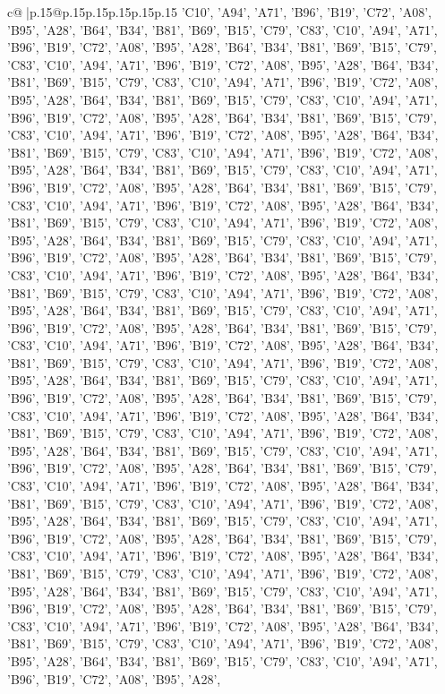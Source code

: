 \documentclass{article}
\begin{document}
{\begin{supertabular}{c@{$\;$}|p{.15\linewidth}@{}p{.15\linewidth}p{.15\linewidth}p{.15\linewidth}p{.15\linewidth}p{.15\linewidth}}
{{{{'C10', 'A94', 'A71', 'B96', 'B19', 'C72', 'A08', 'B95', 'A28', 'B64', 'B34', 'B81', 'B69', 'B15', 'C79', 'C83', 'C10', 'A94', 'A71', 'B96', 'B19', 'C72', 'A08', 'B95', 'A28', 'B64', 'B34', 'B81', 'B69', 'B15', 'C79', 'C83', 'C10', 'A94', 'A71', 'B96', 'B19', 'C72', 'A08', 'B95', 'A28', 'B64', 'B34', 'B81', 'B69', 'B15', 'C79', 'C83', 'C10', 'A94', 'A71', 'B96', 'B19', 'C72', 'A08', 'B95', 'A28', 'B64', 'B34', 'B81', 'B69', 'B15', 'C79', 'C83', 'C10', 'A94', 'A71', 'B96', 'B19', 'C72', 'A08', 'B95', 'A28', 'B64', 'B34', 'B81', 'B69', 'B15', 'C79', 'C83', 'C10', 'A94', 'A71', 'B96', 'B19', 'C72', 'A08', 'B95', 'A28', 'B64', 'B34', 'B81', 'B69', 'B15', 'C79', 'C83', 'C10', 'A94', 'A71', 'B96', 'B19', 'C72', 'A08', 'B95', 'A28', 'B64', 'B34', 'B81', 'B69', 'B15', 'C79', 'C83', 'C10', 'A94', 'A71', 'B96', 'B19', 'C72', 'A08', 'B95', 'A28', 'B64', 'B34', 'B81', 'B69', 'B15', 'C79', 'C83', 'C10', 'A94', 'A71', 'B96', 'B19', 'C72', 'A08', 'B95', 'A28', 'B64', 'B34', 'B81', 'B69', 'B15', 'C79', 'C83', 'C10', 'A94', 'A71', 'B96', 'B19', 'C72', 'A08', 'B95', 'A28', 'B64', 'B34', 'B81', 'B69', 'B15', 'C79', 'C83', 'C10', 'A94', 'A71', 'B96', 'B19', 'C72', 'A08', 'B95', 'A28', 'B64', 'B34', 'B81', 'B69', 'B15', 'C79', 'C83', 'C10', 'A94', 'A71', 'B96', 'B19', 'C72', 'A08', 'B95', 'A28', 'B64', 'B34', 'B81', 'B69', 'B15', 'C79', 'C83', 'C10', 'A94', 'A71', 'B96', 'B19', 'C72', 'A08', 'B95', 'A28', 'B64', 'B34', 'B81', 'B69', 'B15', 'C79', 'C83', 'C10', 'A94', 'A71', 'B96', 'B19', 'C72', 'A08', 'B95', 'A28', 'B64', 'B34', 'B81', 'B69', 'B15', 'C79', 'C83', 'C10', 'A94', 'A71', 'B96', 'B19', 'C72', 'A08', 'B95', 'A28', 'B64', 'B34', 'B81', 'B69', 'B15', 'C79', 'C83', 'C10', 'A94', 'A71', 'B96', 'B19', 'C72', 'A08', 'B95', 'A28', 'B64', 'B34', 'B81', 'B69', 'B15', 'C79', 'C83', 'C10', 'A94', 'A71', 'B96', 'B19', 'C72', 'A08', 'B95', 'A28', 'B64', 'B34', 'B81', 'B69', 'B15', 'C79', 'C83', 'C10', 'A94', 'A71', 'B96', 'B19', 'C72', 'A08', 'B95', 'A28', 'B64', 'B34', 'B81', 'B69', 'B15', 'C79', 'C83', 'C10', 'A94', 'A71', 'B96', 'B19', 'C72', 'A08', 'B95', 'A28', 'B64', 'B34', 'B81', 'B69', 'B15', 'C79', 'C83', 'C10', 'A94', 'A71', 'B96', 'B19', 'C72', 'A08', 'B95', 'A28', 'B64', 'B34', 'B81', 'B69', 'B15', 'C79', 'C83', 'C10', 'A94', 'A71', 'B96', 'B19', 'C72', 'A08', 'B95', 'A28', 'B64', 'B34', 'B81', 'B69', 'B15', 'C79', 'C83', 'C10', 'A94', 'A71', 'B96', 'B19', 'C72', 'A08', 'B95', 'A28', 'B64', 'B34', 'B81', 'B69', 'B15', 'C79', 'C83', 'C10', 'A94', 'A71', 'B96', 'B19', 'C72', 'A08', 'B95', 'A28', 'B64', 'B34', 'B81', 'B69', 'B15', 'C79', 'C83', 'C10', 'A94', 'A71', 'B96', 'B19', 'C72', 'A08', 'B95', 'A28', 'B64', 'B34', 'B81', 'B69', 'B15', 'C79', 'C83', 'C10', 'A94', 'A71', 'B96', 'B19', 'C72', 'A08', 'B95', 'A28', 'B64', 'B34', 'B81', 'B69', 'B15', 'C79', 'C83', 'C10', 'A94', 'A71', 'B96', 'B19', 'C72', 'A08', 'B95', 'A28', 'B64', 'B34', 'B81', 'B69', 'B15', 'C79', 'C83', 'C10', 'A94', 'A71', 'B96', 'B19', 'C72', 'A08', 'B95', 'A28', 'B64', 'B34', 'B81', 'B69', 'B15', 'C79', 'C83', 'C10', 'A94', 'A71', 'B96', 'B19', 'C72', 'A08', 'B95', 'A28', 'B64', 'B34', 'B81', 'B69', 'B15', 'C79', 'C83', 'C10', 'A94', 'A71', 'B96', 'B19', 'C72', 'A08', 'B95', 'A28', }}}}
\end{supertabular}}
\end{document}
